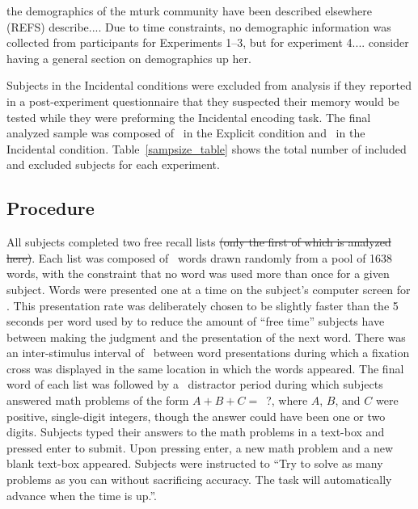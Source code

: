\documentclass[man,natbib,floatsintext]{apa6} %
\begin{document}
\label{TODO-10} the demographics of the mturk community have been described elsewhere (REFS) describe.... Due to time constraints, no demographic information was collected from participants for Experiments 1--3, but for experiment 4.... consider having a general section on demographics up her. 

Subjects in the Incidental conditions were excluded from analysis if they reported in a post-experiment questionnaire that they suspected their memory would be tested while they were preforming the Incidental encoding task. The final analyzed sample was composed of \shoeExplicitIncluded~in the Explicit condition and \shoeIncidentalIncluded~in the Incidental condition. Table~\ref{sampsize_table} shows the total number of included and excluded subjects for each experiment.

\subsection{Procedure}
All subjects completed two free recall lists \st{(only the first of which is analyzed here)}. Each list was composed of \listlength~words drawn randomly from a pool of 1638 words, with the constraint that no word was used more than once for a given subject. Words were presented one at a time on the subject's computer screen for \presrate. This presentation rate was deliberately chosen to be slightly faster than the 5 seconds per word used by \citet{NairEtal17} to reduce the amount of ``free time'' subjects have between making the judgment and the presentation of the next word.
There was an inter-stimulus interval of \isi~between word presentations during which a fixation cross was displayed in the same location in which the words appeared. The final word of each list was followed by a \DFRDelay~distractor period during which subjects answered math problems of the form $A+B+C=$~?, where $A$, $B$, and $C$ were positive, single-digit integers, though the answer could have been one or two digits. Subjects typed their answers to the math problems in a text-box and pressed enter to submit. Upon pressing enter, a new math problem and a new blank text-box appeared. Subjects were instructed to ``Try to solve as many problems as you can without sacrificing accuracy. The task will automatically advance when the time is up.''.
\end{document}
